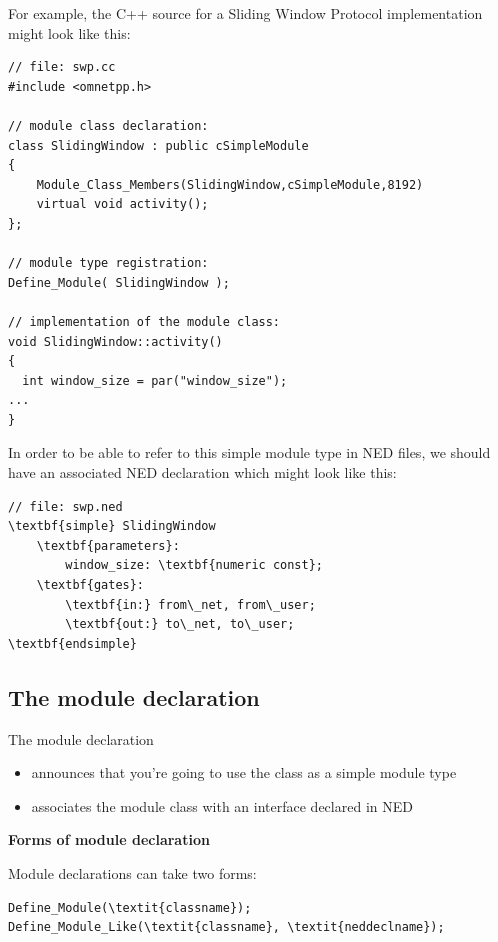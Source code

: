 For example, the C++ source for a Sliding Window Protocol implementation
might look like this:

\begin{verbatim}
// file: swp.cc
#include <omnetpp.h>

// module class declaration:
class SlidingWindow : public cSimpleModule
{
    Module_Class_Members(SlidingWindow,cSimpleModule,8192)
    virtual void activity();
};

// module type registration:
Define_Module( SlidingWindow );

// implementation of the module class:
void SlidingWindow::activity()
{
  int window_size = par("window_size");
...
}
\end{verbatim}

In order to be able to refer to this simple module type in NED
files, we should have an associated NED declaration which might
look like this:


\begin{Verbatim}[commandchars=\\\{\}]
// file: swp.ned
\textbf{simple} SlidingWindow
    \textbf{parameters}:
        window_size: \textbf{numeric const};
    \textbf{gates}:
        \textbf{in:} from\_net, from\_user;
        \textbf{out:} to\_net, to\_user;
\textbf{endsimple}
\end{Verbatim}






\subsection{The module declaration}

The module declaration
\begin{itemize}
\item{announces that you're going to use the class as a
    simple module type}
\item{associates the module class with an interface declared in NED}
\end{itemize}

\textbf{Forms of module declaration}


Module declarations can take two forms:

\begin{Verbatim}[commandchars=\\\{\}]
Define_Module(\textit{classname});
Define_Module_Like(\textit{classname}, \textit{neddeclname});
\end{Verbatim}

